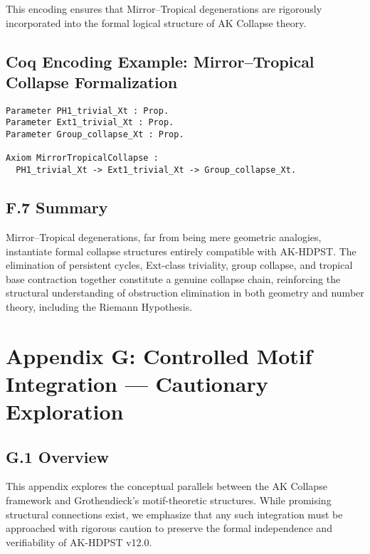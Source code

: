 \documentclass[11pt]{article}
\begin{document}
This encoding ensures that Mirror–Tropical degenerations are rigorously incorporated into the formal logical structure of AK Collapse theory.

\subsection*{Coq Encoding Example: Mirror–Tropical Collapse Formalization}

\begin{lstlisting}[language=Coq, caption=Coq Formalization of Mirror–Tropical Collapse, captionpos=b]
Parameter PH1_trivial_Xt : Prop.
Parameter Ext1_trivial_Xt : Prop.
Parameter Group_collapse_Xt : Prop.

Axiom MirrorTropicalCollapse :
  PH1_trivial_Xt -> Ext1_trivial_Xt -> Group_collapse_Xt.
\end{lstlisting}

\subsection*{F.7 Summary}

Mirror–Tropical degenerations, far from being mere geometric analogies, instantiate formal collapse structures entirely compatible with AK-HDPST. The elimination of persistent cycles, Ext-class triviality, group collapse, and tropical base contraction together constitute a genuine collapse chain, reinforcing the structural understanding of obstruction elimination in both geometry and number theory, including the Riemann Hypothesis.



\section*{Appendix G: Controlled Motif Integration — Cautionary Exploration}

\subsection*{G.1 Overview}

This appendix explores the conceptual parallels between the AK Collapse framework and Grothendieck's motif-theoretic structures. While promising structural connections exist, we emphasize that any such integration must be approached with rigorous caution to preserve the formal independence and verifiability of AK-HDPST v12.0.
\end{document}
